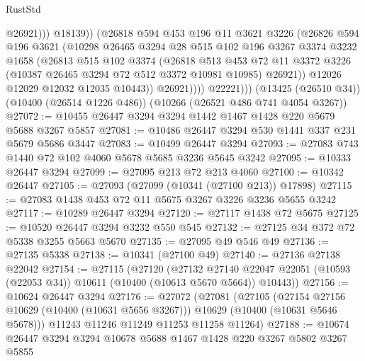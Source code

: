 \begin{lexlean}{RustStd}
\begin{coremodule}
                          @26921)))
                    @18139))
                (@26818
                  @594
                  @453
                  @196
                  @11
                  @3621
                  @3226
                  (@26826
                    @594
                    @196
                    @3621
                    (@10298
                      @26465
                      @3294
                      @28
                      @515
                      @102
                      @196
                      @3267
                      @3374
                      @3232
                      @1658
                      (@26813
                        @515
                        @102
                        @3374
                        (@26818
                          @513
                          @453
                          @72
                          @11
                          @3372
                          @3226
                          (@10387 @26465 @3294 @72 @512 @3372 @10981 @10985)
                          @26921))
                      @12026
                      @12029
                      @12032
                      @12035
                      @10443))
                  @26921))))
          @22221)))
    (@13425 (@26510 @34))
    (@10400 (@26514 @1226 @486))
    (@10266 (@26521 @486 @741 @4054 @3267))
@27072 := @10455 @26447 @3294 @3294 @1442 @1467 @1428 @220 @5679 @5688 @3267 @5857
@27081 := @10486 @26447 @3294 @530 @1441 @337 @231 @5679 @5686 @3447
@27083 := @10499 @26447 @3294
@27093 := @27083 @743 @1440 @72 @102 @4060 @5678 @5685 @3236 @5645 @3242
@27095 := @10333 @26447 @3294
@27099 := @27095 @213 @72 @213 @4060
@27100 := @10342 @26447
@27105 := @27093 (@27099 (@10341 (@27100 @213)) @17898)
@27115 := @27083 @1438 @453 @72 @11 @5675 @3267 @3226 @3236 @5655 @3242
@27117 := @10289 @26447 @3294
@27120 := @27117 @1438 @72 @5675
@27125 := @10520 @26447 @3294 @3232 @550 @545
@27132 := @27125 @34 @372 @72 @5338 @3255 @5663 @5670
@27135 := @27095 @49 @546 @49
@27136 := @27135 @5338
@27138 := @10341 (@27100 @49)
@27140 := @27136 @27138 @22042
@27154 := @27115
    (@27120
      (@27132
        @27140
        @22047
        @22051
        (@10593 (@22053 @34))
        @10611
        (@10400 (@10613 @5670 @5664))
        @10443))
@27156 := @10624 @26447 @3294
@27176 := @27072
    (@27081
      (@27105
        (@27154 @27156 @10629 (@10400 (@10631 @5656 @3267)))
        @10629
        (@10400 (@10631 @5646 @5678)))
      @11243
      @11246
      @11249
      @11253
      @11258
      @11264)
@27188 := @10674 @26447 @3294 @3294 @10678 @5688 @1467 @1428 @220 @3267 @5802 @3267 @5855

\end{coremodule}
\end{lexlean}
